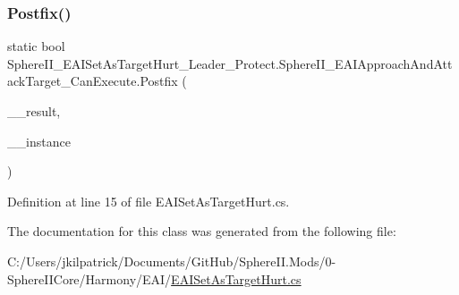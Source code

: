 \subsubsection{\texorpdfstring{Postfix()}{Postfix()}}
{\footnotesize\ttfamily static bool Sphere\+I\+I\+\_\+\+E\+A\+I\+Set\+As\+Target\+Hurt\+\_\+\+Leader\+\_\+\+Protect.\+Sphere\+I\+I\+\_\+\+E\+A\+I\+Approach\+And\+Attack\+Target\+\_\+\+Can\+Execute.\+Postfix (\begin{DoxyParamCaption}\item[{bool}]{\+\_\+\+\_\+result,  }\item[{E\+A\+I\+Approach\+And\+Attack\+Target}]{\+\_\+\+\_\+instance }\end{DoxyParamCaption})\hspace{0.3cm}{\ttfamily [static]}}



Definition at line 15 of file E\+A\+I\+Set\+As\+Target\+Hurt.\+cs.



The documentation for this class was generated from the following file\+:\begin{DoxyCompactItemize}
\item 
C\+:/\+Users/jkilpatrick/\+Documents/\+Git\+Hub/\+Sphere\+I\+I.\+Mods/0-\/\+Sphere\+I\+I\+Core/\+Harmony/\+E\+A\+I/\mbox{\hyperlink{_e_a_i_set_as_target_hurt_8cs}{E\+A\+I\+Set\+As\+Target\+Hurt.\+cs}}\end{DoxyCompactItemize}

